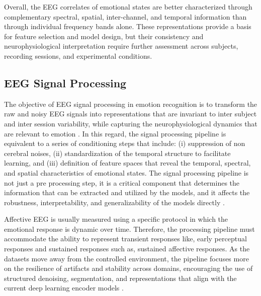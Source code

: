 \documentclass[ASNA,twocolumn]{USG}
\begin{document}
Overall, the EEG correlates of emotional states are better characterized through complementary spectral, spatial, inter-channel, and temporal information than through individual frequency bands alone. These representations provide a basis for feature selection and model design, but their consistency and neurophysiological interpretation require further assessment across subjects, recording sessions, and experimental conditions.

\subsection{EEG Signal Processing}

The objective of EEG signal processing in emotion recognition is to transform the raw and noisy EEG signals into representations that are invariant to inter subject and inter session variability, while capturing the neurophysiological dynamics that are relevant to emotion \cite{fdez2021cross}. In this regard, the signal processing pipeline is equivalent to a series of conditioning steps that include: (i) suppression of non cerebral noises, (ii) standardization of the temporal structure to facilitate learning, and (iii) definition of feature spaces that reveal the temporal, spectral, and spatial characteristics of emotional states. The signal processing pipeline is not just a pre processing step, it is a critical component that determines the information that can be extracted and utilized by the models, and it affects the robustness, interpretability, and generalizability of the models directly \cite{li2022eeg}.

Affective EEG is usually measured using a specific protocol in which the emotional response is dynamic over time. Therefore, the processing pipeline must accommodate the ability to represent transient responses like, early perceptual responses and sustained responses such as, sustained affective responses. As the datasets move away from the controlled environment, the pipeline focuses more on the resilience of artifacts and stability across domains, encouraging the use of structured denoising, segmentation, and representations that align with the current deep learning encoder models \cite{wang2024dmmr}.
\end{document}
